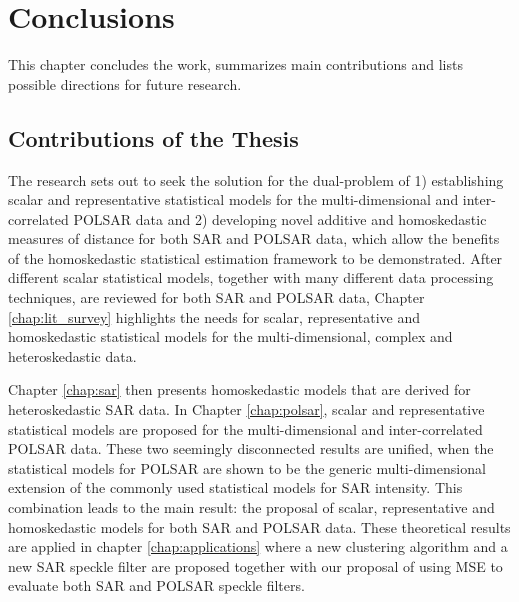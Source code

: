 \chapter{Conclusions} %
\label{chap:conclusions}



This chapter concludes the work, summarizes main contributions and lists possible directions for future research.


\section{Contributions of the Thesis}
\label{sec:conclusion_contribution}

The research sets out to seek the solution for the dual-problem of 
1) establishing scalar and representative statistical models for the multi-dimensional and inter-correlated POLSAR data 
and 
2) developing novel additive and homoskedastic measures of distance for both SAR and POLSAR data, which allow the benefits of the homoskedastic statistical estimation framework to be demonstrated. 
After different scalar statistical models, together with many different data processing techniques, are reviewed for both SAR and POLSAR data,
  Chapter \ref{chap:lit_survey} highlights the needs for scalar, representative and homoskedastic statistical models for the multi-dimensional, complex and heteroskedastic data.

  Chapter \ref{chap:sar} then presents homoskedastic models that are derived for heteroskedastic SAR data. 
In Chapter \ref{chap:polsar}, scalar and representative statistical models are proposed for the multi-dimensional and inter-correlated POLSAR data.
These two seemingly disconnected results are unified, when the statistical models for POLSAR are shown to be the generic multi-dimensional extension of the commonly used statistical models for SAR intensity.
This combination leads to the main result: the proposal of scalar, representative and homoskedastic models for both SAR and POLSAR data.
These theoretical results are applied in chapter \ref{chap:applications} where a new clustering algorithm and a new SAR speckle filter are proposed together with our proposal of using MSE to evaluate both SAR and POLSAR speckle filters.


